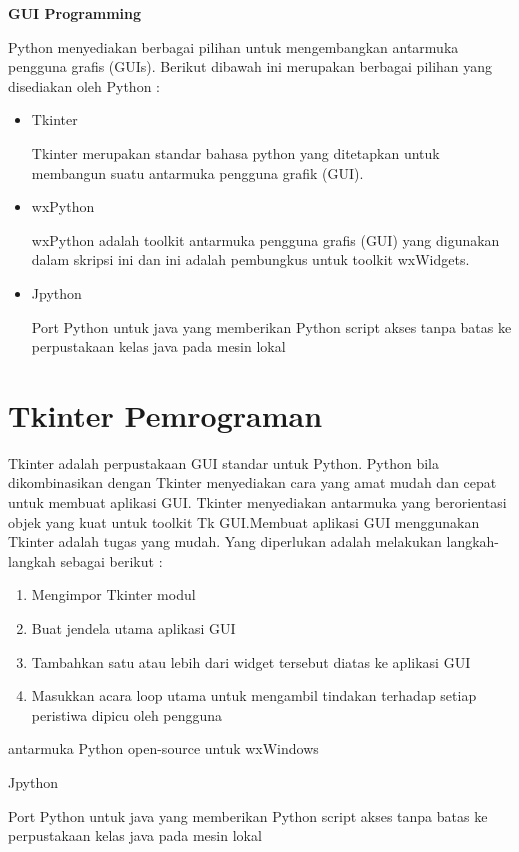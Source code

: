 



\textbf{GUI Programming}

Python menyediakan berbagai pilihan untuk mengembangkan antarmuka pengguna grafis (GUIs). 
Berikut dibawah ini merupakan berbagai pilihan yang disediakan oleh Python :
\begin{itemize}
\item Tkinter \par
Tkinter merupakan standar bahasa python yang ditetapkan untuk membangun suatu antarmuka pengguna grafik (GUI). 
\item wxPython \par
wxPython adalah toolkit antarmuka pengguna grafis (GUI) yang digunakan dalam skripsi ini dan ini adalah pembungkus untuk toolkit wxWidgets.
\item Jpython \par
Port Python untuk java yang memberikan Python script akses tanpa batas ke perpustakaan kelas java pada mesin lokal \par
\end{itemize}
\vspace{12pt}
\noindent 
\section{\textbf Tkinter Pemrograman}
Tkinter adalah perpustakaan GUI standar untuk Python. Python bila dikombinasikan dengan Tkinter menyediakan cara yang amat mudah dan cepat untuk membuat aplikasi GUI. Tkinter menyediakan antarmuka yang berorientasi objek yang kuat untuk toolkit Tk GUI.Membuat aplikasi GUI menggunakan Tkinter adalah tugas yang mudah. Yang diperlukan adalah melakukan langkah-langkah sebagai berikut : 
\begin{enumerate} 
	\item Mengimpor Tkinter modul 
	\item Buat jendela utama aplikasi GUI
	\item Tambahkan satu atau lebih dari widget tersebut diatas ke aplikasi GUI
	\item Masukkan acara loop utama untuk mengambil tindakan terhadap setiap peristiwa dipicu oleh pengguna
\end{enumerate}


antarmuka Python open-source untuk wxWindows 
 
\item Jpython 

Port Python untuk java yang memberikan Python script akses tanpa batas ke perpustakaan kelas java pada mesin lokal 

